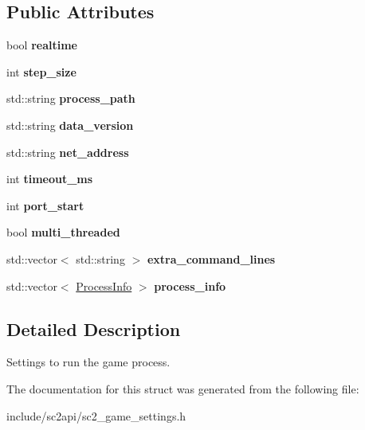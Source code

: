 \subsection*{Public Attributes}
\begin{DoxyCompactItemize}
\item 
\mbox{\label{structsc2_1_1_process_settings_a2720fc0137245101de56ea2ef150e8a0}} 
bool {\bfseries realtime}
\item 
\mbox{\label{structsc2_1_1_process_settings_a408a3a92cb61339830c831742adfbb4a}} 
int {\bfseries step\+\_\+size}
\item 
\mbox{\label{structsc2_1_1_process_settings_abbc11a42555fa0a1e036ee7c9bbccb48}} 
std\+::string {\bfseries process\+\_\+path}
\item 
\mbox{\label{structsc2_1_1_process_settings_a1ce4fd912711b5dbefccdce6842f7d6c}} 
std\+::string {\bfseries data\+\_\+version}
\item 
\mbox{\label{structsc2_1_1_process_settings_aaf19b8eb91c8e8d29cc111452971f846}} 
std\+::string {\bfseries net\+\_\+address}
\item 
\mbox{\label{structsc2_1_1_process_settings_ad9a9aa89b406de8ed838bfcdfbeb3212}} 
int {\bfseries timeout\+\_\+ms}
\item 
\mbox{\label{structsc2_1_1_process_settings_af3c345fbed5244b4e87d5400f41a8b95}} 
int {\bfseries port\+\_\+start}
\item 
\mbox{\label{structsc2_1_1_process_settings_acfcb81c1496917bf9d1eceb523e95564}} 
bool {\bfseries multi\+\_\+threaded}
\item 
\mbox{\label{structsc2_1_1_process_settings_afc9af209c9f715c2bea2dcd916fe263e}} 
std\+::vector$<$ std\+::string $>$ {\bfseries extra\+\_\+command\+\_\+lines}
\item 
\mbox{\label{structsc2_1_1_process_settings_a65ac75579205357a6c59c500fb8783f8}} 
std\+::vector$<$ \hyperlink{structsc2_1_1_process_info}{Process\+Info} $>$ {\bfseries process\+\_\+info}
\end{DoxyCompactItemize}


\subsection{Detailed Description}
Settings to run the game process. 

The documentation for this struct was generated from the following file\+:\begin{DoxyCompactItemize}
\item 
include/sc2api/sc2\+\_\+game\+\_\+settings.\+h\end{DoxyCompactItemize}
